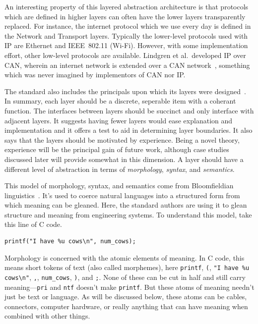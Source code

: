 \documentclass[english,12pt,a4paper,pdftex,eng,utf8]{aaltothesis}
\begin{document}
An interesting property of this layered abstraction architecture is that protocols which are defined in higher layers can often have the lower layers transparently replaced.  For instance, the internet protocol which we use every day is defined in the Network and Transport layers.  Typically the lower-level protocols used with IP are Ethernet and IEEE~802.11 (Wi-Fi).  However, with some implementation effort, other low-level protocols are available.  Lindgren et al.\ developed IP over CAN, wherein an internet network is extended over a CAN network~\cite{Lindgren2008}, something which was never imagined by implementors of CAN nor IP.\

The standard also includes the principals upon which its layers were designed~\cite[§6.2.1]{ISO7498-1}.  In summary, each layer should be a discrete, seperable item with a coherant function.  The interfaces between layers should be succinct and only interface with adjacent layers.  It suggests having fewer layers would ease explanation and implementation and it offers a test to aid in determining layer boundaries.  It also says that the layers should be motivated by experience.  Being a novel theory, experience will be the principal gain of future work, although case studies discussed later will provide somewhat in this dimension.  A layer should have a different level of abstraction in terms of {\it morphology}, {\it syntax}, and {\it semantics}.

This model of morphology, syntax, and semantics come from Bloomfieldian linguistics~\cite{Bloomfield1923}.  It's used to coerce natural languages into a structured form from which meaning can be gleaned.  Here, the standard authors are using it to glean structure and meaning from engineering systems.  To understand this model, take this line of C code.

\begin{verbatim}
printf("I have %u cows\n", num_cows);
\end{verbatim}

Morphology is concerned with the atomic elements of meaning.  In C code, this means short tokens of text (also called morphemes), here \verb|printf|, \verb|(|, \verb|"I have %u cows\n"|, \verb|,|, \verb|num_cows|, \verb|)|, and \verb|;|.  None of these can be cut in half and still carry meaning---\verb|pri| and \verb|ntf| doesn't make \verb|printf|.  But these atoms of meaning needn't just be text or language.  As will be discussed below, these atoms can be cables, connectors, computer hardware, or really anything that can have meaning when combined with other things.
\end{document}
